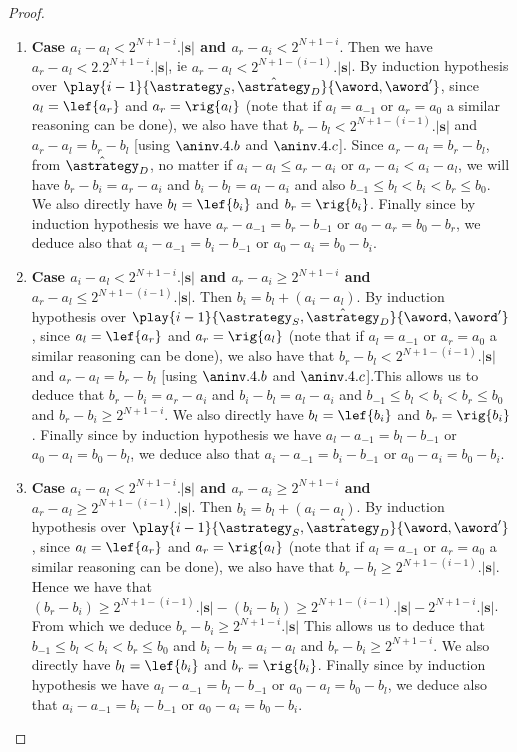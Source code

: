 \begin{proof}
\begin{enumerate}
\item \textbf{Case $a_i-a_l<  2^{N+1-i}.|\mathbf{s}|$ and $a_r-a_i < 2^{N+1-i}$}. Then we have $a_r-a_l < 2.2^{N+1-i}.|\mathbf{s}|$, ie $a_r-a_l < 2^{N+1-(i-1)}.|\mathbf{s}|$. By induction hypothesis over $\play{i-1}{\astrategy_S,\hat\astrategy_D}{\aword,\aword'}$, since $a_l=\lef{a_r}$ and $a_r=\rig{a_l}$ (note that if $a_l=a_{-1}$ or $a_r=a_0$ a similar reasoning can be done),  we also have that  $b_r-b_l < 2^{N+1-(i-1)}.|\mathbf{s}|$ and $a_r-a_l=b_r-b_l$ [using $\aninv.4.b$ and $\aninv.4.c$]. Since $a_r-a_l=b_r-b_l$, from $\hat\astrategy_D$, no matter if $a_i-a_l \leq a_r-a_i$ or $a_r-a_i < a_i-a_l$, we will have $b_r-b_i=a_r-a_i$ and $b_i-b_l=a_l-a_i$ and also $b_{-1} \leq b_l < b_i < b_r \leq b_0$. We also directly have $b_l=\lef{b_i}$ and $b_r=\rig{b_i}$. Finally since by induction hypothesis we have $a_{r}-a_{-1}=b_{r}-b_{-1}$ or $a_{0}-a_{r}=b_{0}-b_{r}$, we deduce also that $a_{i}-a_{-1}=b_{i}-b_{-1}$ or $a_{0}-a_{i}=b_{0}-b_{i}$.
\item \textbf{Case $a_i-a_l < 2^{N+1-i}.|\mathbf{s}|$ and $a_r-a_i \geq 2^{N+1-i}$ and $a_r-a_l \leq 2^{N+1-(i-1)}.|\mathbf{s}|$}. Then $b_i=b_l+(a_i-a_l)$.  By induction hypothesis over $\play{i-1}{\astrategy_S,\hat\astrategy_D}{\aword,\aword'}$, since $a_l=\lef{a_r}$ and $a_r=\rig{a_l}$ (note that if $a_l=a_{-1}$ or $a_r=a_0$ a similar reasoning can be done),  we also have that  $b_r-b_l < 2^{N+1-(i-1)}.|\mathbf{s}|$ and $a_r-a_l=b_r-b_l$ [using $\aninv.4.b$ and $\aninv.4.c$].This allows us to deduce that $b_r-b_i=a_r-a_i$ and $b_i-b_l=a_l-a_i$ and  $b_{-1} \leq b_l < b_i < b_r \leq b_0$ and $b_r-b_i \geq 2^{N+1-i}$. We also directly have $b_l=\lef{b_i}$ and $b_r=\rig{b_i}$. Finally since by induction hypothesis we have $a_{l}-a_{-1}=b_{l}-b_{-1}$ or $a_{0}-a_{l}=b_{0}-b_{l}$, we deduce also that $a_{i}-a_{-1}=b_{i}-b_{-1}$ or $a_{0}-a_{i}=b_{0}-b_{i}$.
\item \textbf{Case $a_i-a_l < 2^{N+1-i}.|\mathbf{s}|$ and $a_r-a_i \geq 2^{N+1-i}$ and $a_r-a_l \geq 2^{N+1-(i-1)}.|\mathbf{s}|$}. Then $b_i=b_l+(a_i-a_l)$.  By induction hypothesis over $\play{i-1}{\astrategy_S,\hat\astrategy_D}{\aword,\aword'}$, since $a_l=\lef{a_r}$ and $a_r=\rig{a_l}$ (note that if $a_l=a_{-1}$ or $a_r=a_0$ a similar reasoning can be done),  we also have that  $b_r-b_l \geq  2^{N+1-(i-1)}.|\mathbf{s}|$. Hence we have that $(b_r-b_i) \geq 2^{N+1-(i-1)}.|\mathbf{s}| - (b_i-b_l) \geq 2^{N+1-(i-1)}.|\mathbf{s}| -  2^{N+1-i}.|\mathbf{s}| $. From which we deduce $b_r-b_i \geq 2^{N+1-i}.|\mathbf{s}|$ This allows us to deduce that  $b_{-1} \leq b_l < b_i < b_r \leq b_0$ and $b_i-b_l=a_i-a_l$ and $b_r-b_i \geq 2^{N+1-i}$. We also directly have $b_l=\lef{b_i}$ and $b_r=\rig{b_i}$. Finally since by induction hypothesis we have $a_{l}-a_{-1}=b_{l}-b_{-1}$ or $a_{0}-a_{l}=b_{0}-b_{l}$, we deduce also that $a_{i}-a_{-1}=b_{i}-b_{-1}$ or $a_{0}-a_{i}=b_{0}-b_{i}$.

\end{enumerate}
\end{proof}
